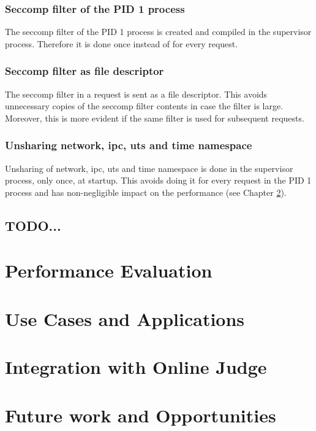 \documentclass[en]{pracamgr}
\begin{document}
\subsection{Seccomp filter of the PID 1 process}

The seccomp filter of the PID 1 process is created and compiled in the supervisor process. Therefore it is done once instead of for every request.

\subsection{Seccomp filter as file descriptor}

The seccomp filter in a request is sent as a file descriptor. This avoids unnecessary copies of the seccomp filter contents in case the filter is large. Moreover, this is more evident if the same filter is used for subsequent requests.

\subsection{Unsharing network, ipc, uts and time namespace}

Unsharing of network, ipc, uts and time namespace is done in the supervisor process, only once, at startup. This avoids doing it for every request in the PID 1 process and has non-negligible impact on the performance (see Chapter \ref{chapter:performance}).

\section{TODO...}
\chapter{Performance Evaluation}\label{chapter:performance}

\chapter{Use Cases and Applications}\label{chapter:use_cases}

\chapter{Integration with Online Judge}\label{chapter:integration}

\chapter{Future work and Opportunities}\label{chapter:future_work}
\end{document}
